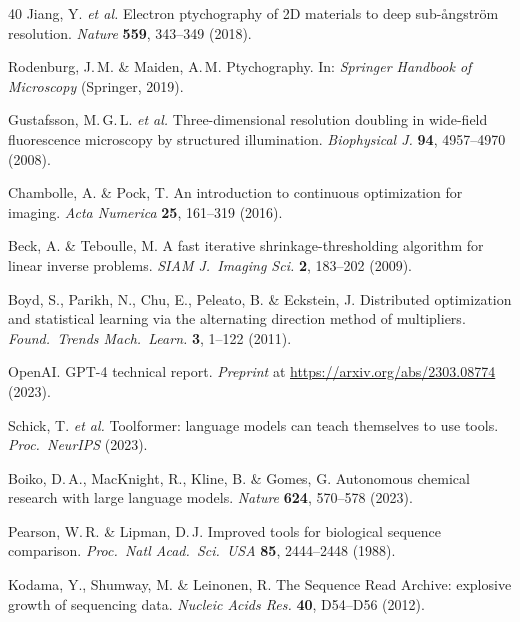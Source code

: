 \documentclass[11pt,a4paper]{article}
\begin{document}
\begin{thebibliography}{40}
Jiang, Y. \textit{et al.}
Electron ptychography of 2D materials to deep sub-{\aa}ngstr{\"o}m resolution.
\textit{Nature} \textbf{559}, 343--349 (2018).

Rodenburg, J.\,M. \& Maiden, A.\,M.
Ptychography.
In: \textit{Springer Handbook of Microscopy} (Springer, 2019).

Gustafsson, M.\,G.\,L. \textit{et al.}
Three-dimensional resolution doubling in wide-field fluorescence microscopy by structured illumination.
\textit{Biophysical J.} \textbf{94}, 4957--4970 (2008).

Chambolle, A. \& Pock, T.
An introduction to continuous optimization for imaging.
\textit{Acta Numerica} \textbf{25}, 161--319 (2016).

Beck, A. \& Teboulle, M.
A fast iterative shrinkage-thresholding algorithm for linear inverse problems.
\textit{SIAM J.\ Imaging Sci.} \textbf{2}, 183--202 (2009).

Boyd, S., Parikh, N., Chu, E., Peleato, B. \& Eckstein, J.
Distributed optimization and statistical learning via the alternating direction method of multipliers.
\textit{Found.\ Trends Mach.\ Learn.} \textbf{3}, 1--122 (2011).

OpenAI.
GPT-4 technical report.
\textit{Preprint} at \url{https://arxiv.org/abs/2303.08774} (2023).

Schick, T. \textit{et al.}
Toolformer: language models can teach themselves to use tools.
\textit{Proc.\ NeurIPS} (2023).

Boiko, D.\,A., MacKnight, R., Kline, B. \& Gomes, G.
Autonomous chemical research with large language models.
\textit{Nature} \textbf{624}, 570--578 (2023).

Pearson, W.\,R. \& Lipman, D.\,J.
Improved tools for biological sequence comparison.
\textit{Proc.\ Natl Acad.\ Sci.\ USA} \textbf{85}, 2444--2448 (1988).

Kodama, Y., Shumway, M. \& Leinonen, R.
The Sequence Read Archive: explosive growth of sequencing data.
\textit{Nucleic Acids Res.} \textbf{40}, D54--D56 (2012).

\end{thebibliography}
\endgroup
\end{document}
